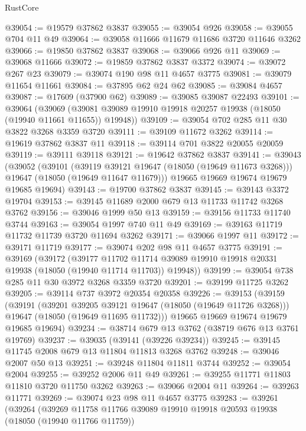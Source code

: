 \begin{lexlean}{RustCore}
\begin{coremodule}
@39054 := @19579 @37862 @3837
@39055 := @39054 @926
@39058 := @39055 @704 @11 @49
@39064 := @39058 @11666 @11679 @11686 @3720 @11646 @3262
@39066 := @19850 @37862 @3837
@39068 := @39066 @926 @11
@39069 := @39068 @11666
@39072 := @19859 @37862 @3837 @3372
@39074 := @39072 @267 @23
@39079 := @39074 @190 @98 @11 @4657 @3775
@39081 := @39079 @11654 @11661
@39084 := @37895 @62 @24 @62
@39085 := @39084 @4657
@39087 := @17609 (@37900 @62)
@39089 := @39085 @39087 @22493
@39101 := @39064
    (@39069 (@39081 @39089 @19910 @19918 @20257 @19938 (@18050 (@19940 @11661 @11655)) @19948))
@39109 := @39054 @702 @285 @11 @30 @3822 @3268 @3359 @3720
@39111 := @39109 @11672 @3262
@39114 := @19619 @37862 @3837 @11
@39118 := @39114 @701 @3822 @20055 @20059
@39119 := @39111 @39118
@39121 := @19642 @37862 @3837
@39141 := @39043
    (@39052
      (@39101
        (@39119 @39121 @19647 (@18050 (@19649 @11673 @3268)))
        @19647
        (@18050 (@19649 @11647 @11679)))
      @19665
      @19669
      @19674
      @19679
      @19685
      @19694)
@39143 := @19700 @37862 @3837
@39145 := @39143 @3372 @19704
@39153 := @39145 @11689 @2000 @679 @13 @11733 @11742 @3268 @3762
@39156 := @39046 @1999 @50 @13
@39159 := @39156 @11733 @11740 @3744
@39163 := @39054 @1997 @740 @11 @49
@39169 := @39163 @11719 @11732 @11739 @3720 @11694 @3262
@39171 := @39066 @1997 @11
@39172 := @39171 @11719
@39177 := @39074 @202 @98 @11 @4657 @3775
@39191 := @39169
    (@39172
      (@39177
        @11702
        @11714
        @39089
        @19910
        @19918
        @20331
        @19938
        (@18050 (@19940 @11714 @11703))
        @19948))
@39199 := @39054 @738 @285 @11 @30 @3972 @3268 @3359 @3720
@39201 := @39199 @11725 @3262
@39205 := @39114 @737 @3972 @20354 @20358
@39226 := @39153
    (@39159
      (@39191
        (@39201 @39205 @39121 @19647 (@18050 (@19649 @11726 @3268)))
        @19647
        (@18050 (@19649 @11695 @11732)))
      @19665
      @19669
      @19674
      @19679
      @19685
      @19694)
@39234 := @38714 @679 @13 @3762 (@38719 @676 @13 @3761 @19769)
@39237 := @39035 (@39141 (@39226 @39234))
@39245 := @39145 @11745 @2008 @679 @13 @11804 @11813 @3268 @3762
@39248 := @39046 @2007 @50 @13
@39251 := @39248 @11804 @11811 @3744
@39252 := @39054 @2004
@39255 := @39252 @2006 @11 @49
@39261 := @39255 @11771 @11803 @11810 @3720 @11750 @3262
@39263 := @39066 @2004 @11
@39264 := @39263 @11771
@39269 := @39074 @23 @98 @11 @4657 @3775
@39283 := @39261
    (@39264
      (@39269
        @11758
        @11766
        @39089
        @19910
        @19918
        @20593
        @19938
        (@18050 (@19940 @11766 @11759))

\end{coremodule}
\end{lexlean}
